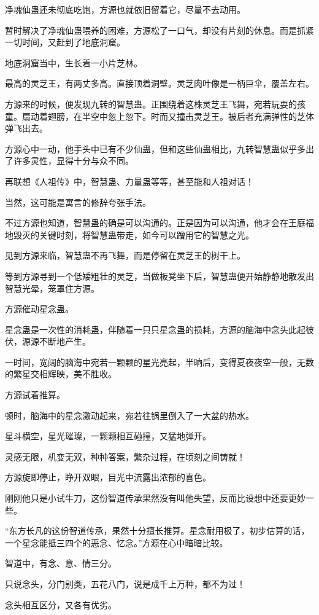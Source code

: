 \begin{this_body}
净魂仙蛊还未彻底吃饱，方源也就依旧留着它，尽量不去动用。

暂时解决了净魂仙蛊喂养的困难，方源松了一口气，却没有片刻的休息。而是抓紧一切时间，又赶到了地底洞窟。

地底洞窟当中，生长着一小片芝林。

最高的灵芝王，有两丈多高。直接顶着洞壁。灵芝肉叶像是一柄巨伞，覆盖左右。

方源来的时候，便发现九转的智慧蛊。正围绕着这株灵芝王飞舞，宛若玩耍的孩童。扇动着翅膀，在半空中忽上忽下。时而又撞击灵芝王。被后者充满弹性的芝体弹飞出去。

方源心中一动，他手头中已有不少仙蛊，但和这些仙蛊相比，九转智慧蛊似乎多出了许多灵性，显得十分与众不同。

再联想《人祖传》中，智慧蛊、力量蛊等等，甚至能和人祖对话！

当然，这可能是寓言的修辞夸张手法。

不过方源也知道，智慧蛊的确是可以沟通的。正是因为可以沟通，他才会在王庭福地毁灭的关键时刻，将智慧蛊带走，如今可以蹭用它的智慧之光。

见到方源来临，智慧蛊不再飞舞，而是停留在灵芝王的树干上。

等到方源寻到一个低矮粗壮的灵芝，当做板凳坐下后，智慧蛊便开始静静地散发出智慧光晕，笼罩住方源。

方源催动星念蛊。

星念蛊是一次性的消耗蛊，伴随着一只只星念蛊的损耗，方源的脑海中念头此起彼伏，源源不断地产生。

一时间，宽阔的脑海中宛若一颗颗的星光亮起，半晌后，变得夏夜夜空一般，无数的繁星交相辉映，美不胜收。

方源试着推算。

顿时，脑海中的星念激动起来，宛若往锅里倒入了一大盆的热水。

星斗横空，星光璀璨，一颗颗相互碰撞，又猛地弹开。

灵感无限，机变无双，种种答案，繁杂过程，在顷刻之间铸就！

方源旋即停止，睁开双眼，目光中流露出浓郁的喜色。

刚刚他只是小试牛刀，这份智道传承果然没有叫他失望，反而比设想中还要更妙一些。

“东方长凡的这份智道传承，果然十分擅长推算。星念耐用极了，初步估算的话，一个星念能抵三四个的恶念、忆念。”方源在心中暗暗比较。

智道中，有念、意、情三分。

只说念头，分门别类，五花八门，说是成千上万种，都不为过！

念头相互区分，又各有优劣。


\end{this_body}
